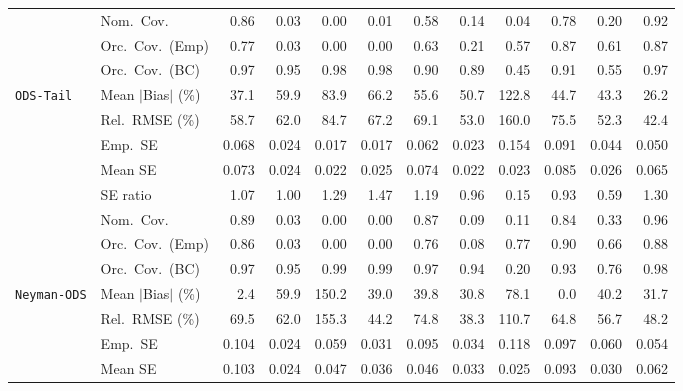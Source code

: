 \begin{landscape}
\begin{longtable}{llrrrrrrrrrr}
 & Nom.\ Cov. & \cellcolor{ranktwo}0.86 & 0.03 & 0.00 & 0.01 & 0.58 & 0.14 & 0.04 & \cellcolor{rankthree}0.78 & 0.20 & \cellcolor{rankone}0.92 \\
 & Orc.\ Cov.\ (Emp) & \cellcolor{rankthree}0.77 & 0.03 & 0.00 & 0.00 & 0.63 & 0.21 & 0.57 & \cellcolor{rankone}0.87 & 0.61 & \cellcolor{ranktwo}0.87 \\
 & Orc.\ Cov.\ (BC) & \cellcolor{rankthree}0.97 & \cellcolor{rankone}0.95 & 0.98 & 0.98 & 0.90 & 0.89 & 0.45 & 0.91 & 0.55 & \cellcolor{ranktwo}0.97 \\
\addlinespace[2pt]
\quad \texttt{ODS-Tail} & Mean $|$Bias$|$ (\%) & \cellcolor{ranktwo}37.1 & 59.9 & 83.9 & 66.2 & 55.6 & 50.7 & 122.8 & 44.7 & \cellcolor{rankthree}43.3 & \cellcolor{rankone}26.2 \\
 & Rel.\ RMSE (\%) & 58.7 & 62.0 & 84.7 & 67.2 & 69.1 & \cellcolor{rankthree}53.0 & 160.0 & 75.5 & \cellcolor{ranktwo}52.3 & \cellcolor{rankone}42.4 \\
 & Emp.\ SE & 0.068 & 0.024 & 0.017 & 0.017 & 0.062 & 0.023 & 0.154 & 0.091 & 0.044 & 0.050 \\
 & Mean SE & 0.073 & 0.024 & 0.022 & 0.025 & 0.074 & 0.022 & 0.023 & 0.085 & 0.026 & 0.065 \\
 & SE ratio & 1.07 & \cellcolor{rankone}1.00 & 1.29 & 1.47 & 1.19 & \cellcolor{ranktwo}0.96 & 0.15 & \cellcolor{rankthree}0.93 & 0.59 & 1.30 \\
 & Nom.\ Cov. & \cellcolor{ranktwo}0.89 & 0.03 & 0.00 & 0.00 & \cellcolor{rankthree}0.87 & 0.09 & 0.11 & 0.84 & 0.33 & \cellcolor{rankone}0.96 \\
 & Orc.\ Cov.\ (Emp) & \cellcolor{rankthree}0.86 & 0.03 & 0.00 & 0.00 & 0.76 & 0.08 & 0.77 & \cellcolor{rankone}0.90 & 0.66 & \cellcolor{ranktwo}0.88 \\
 & Orc.\ Cov.\ (BC) & \cellcolor{rankthree}0.97 & \cellcolor{rankone}0.95 & 0.99 & 0.99 & 0.97 & \cellcolor{ranktwo}0.94 & 0.20 & 0.93 & 0.76 & 0.98 \\
\addlinespace[2pt]
\quad \texttt{Neyman-ODS} & Mean $|$Bias$|$ (\%) & \cellcolor{ranktwo}2.4 & 59.9 & 150.2 & 39.0 & 39.8 & \cellcolor{rankthree}30.8 & 78.1 & \cellcolor{rankone}0.0 & 40.2 & 31.7 \\
 & Rel.\ RMSE (\%) & 69.5 & 62.0 & 155.3 & \cellcolor{ranktwo}44.2 & 74.8 & \cellcolor{rankone}38.3 & 110.7 & 64.8 & 56.7 & \cellcolor{rankthree}48.2 \\
 & Emp.\ SE & 0.104 & 0.024 & 0.059 & 0.031 & 0.095 & 0.034 & 0.118 & 0.097 & 0.060 & 0.054 \\
 & Mean SE & 0.103 & 0.024 & 0.047 & 0.036 & 0.046 & 0.033 & 0.025 & 0.093 & 0.030 & 0.062 \\

\end{longtable}
\end{landscape}
